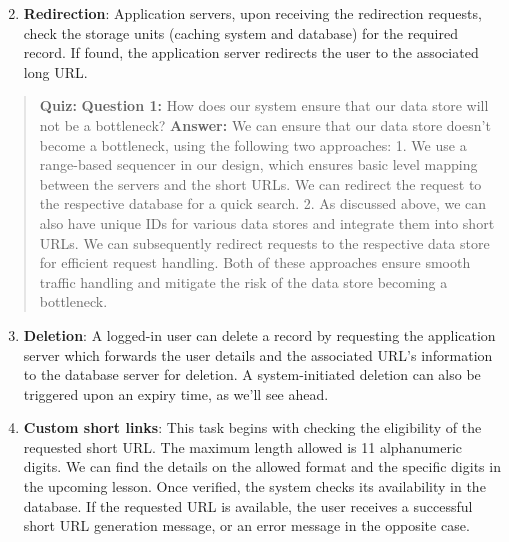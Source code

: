 \begin{enumerate}
\setcounter{enumi}{1}
\item
\protect{}\label{9nXtM7wBSa_6FX5TjLGHj}
\textbf{Redirection}: Application servers, upon receiving the redirection requests, check the storage units (caching system and database) for the required record. If found, the application server redirects the user to the associated long URL.
\end{enumerate}

\begin{quote}
\textbf{Quiz:}
\textbf{Question 1:} How does our system ensure that our data store will not be a bottleneck?
\textbf{Answer:} We can ensure that our data store doesn't become a bottleneck, using the following two approaches: 1. We use a range-based sequencer in our design, which ensures basic level mapping between the servers and the short URLs. We can redirect the request to the respective database for a quick search. 2. As discussed above, we can also have unique IDs for various data stores and integrate them into short URLs. We can subsequently redirect requests to the respective data store for efficient request handling. Both of these approaches ensure smooth traffic handling and mitigate the risk of the data store becoming a bottleneck.
\end{quote}

\begin{enumerate}
\setcounter{enumi}{2}
\item
\protect{}\label{dD5mxltDqec9zUcyxkNny}
\textbf{Deletion}: A logged-in user can delete a record by requesting the application server which forwards the user details and the associated URL's information to the database server for deletion. A system-initiated deletion can also be triggered upon an expiry time, as we'll see ahead.
\item
\protect{}\label{oIRHjBhcE3iSQPwfifdlt}
\textbf{Custom short links}: This task begins with checking the eligibility of the requested short URL. The maximum length allowed is 11 alphanumeric digits. We can find the details on the allowed format and the specific digits in the upcoming lesson. Once verified, the system checks its availability in the database. If the requested URL is available, the user receives a successful short URL generation message, or an error message in the opposite case.
\end{enumerate}

